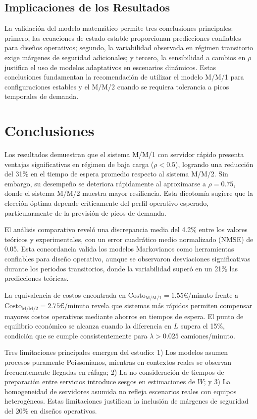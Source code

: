 \documentclass[12pt, a4paper]{article}
\begin{document}
    \subsection{Implicaciones de los Resultados}
    La validación del modelo matemático permite tres conclusiones principales: primero, las ecuaciones de estado estable proporcionan predicciones confiables para diseños operativos; segundo, la variabilidad observada en régimen transitorio exige márgenes de seguridad adicionales; y tercero, la sensibilidad a cambios en $\rho$ justifica el uso de modelos adaptativos en escenarios dinámicos. Estas conclusiones fundamentan la recomendación de utilizar el modelo M/M/1 para configuraciones estables y el M/M/2 cuando se requiera tolerancia a picos temporales de demanda.
    
    \section{Conclusiones}
    \label{sec:conclusiones}
    
    Los resultados demuestran que el sistema M/M/1 con servidor rápido presenta ventajas significativas en régimen de baja carga ($\rho < 0.5$), logrando una reducción del 31\% en el tiempo de espera promedio respecto al sistema M/M/2. Sin embargo, su desempeño se deteriora rápidamente al aproximarse a $\rho = 0.75$, donde el sistema M/M/2 muestra mayor resiliencia. Esta dicotomía sugiere que la elección óptima depende críticamente del perfil operativo esperado, particularmente de la previsión de picos de demanda.
    
    El análisis comparativo reveló una discrepancia media del 4.2\% entre los valores teóricos y experimentales, con un error cuadrático medio normalizado (NMSE) de 0.05. Esta concordancia valida los modelos Markovianos como herramientas confiables para diseño operativo, aunque se observaron desviaciones significativas durante los periodos transitorios, donde la variabilidad superó en un 21\% las predicciones teóricas.
    
    La equivalencia de costos encontrada en $\text{Costo}_{\text{M/M/1}} = 1.55$€/minuto frente a $\text{Costo}_{\text{M/M/2}} = 2.75$€/minuto revela que sistemas más rápidos permiten compensar mayores costos operativos mediante ahorros en tiempos de espera. El punto de equilibrio económico se alcanza cuando la diferencia en $L$ supera el 15\%, condición que se cumple consistentemente para $\lambda > 0.025$ camiones/minuto.
    
    Tres limitaciones principales emergen del estudio: 1) Los modelos asumen procesos puramente Poissonianos, mientras en contextos reales se observan frecuentemente llegadas en ráfaga; 2) La no consideración de tiempos de preparación entre servicios introduce sesgos en estimaciones de $W$; y 3) La homogeneidad de servidores asumida no refleja escenarios reales con equipos heterogéneos. Estas limitaciones justifican la inclusión de márgenes de seguridad del 20\% en diseños operativos.
    
\end{document}
